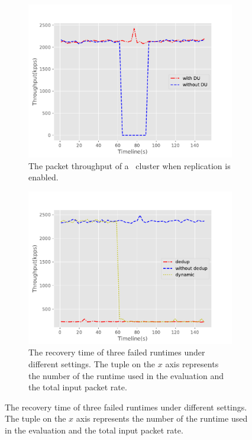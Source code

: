\begin{figure}[!ht]
\begin{subfigure}[t]{0.33\linewidth}
   \centering
   \includegraphics[width=\columnwidth]{figure/Dynamic.pdf}
   \caption{The packet throughput of a \nfactor~cluster when replication is enabled. }\label{fig:rep-scale}
  \end{subfigure}\hfill
  \begin{subfigure}[t]{0.33\linewidth}
 \centering
   \includegraphics[width=\columnwidth]{figure/Dedup.pdf}
   \caption{The recovery time of three failed runtimes under different settings. The tuple on the $x$ axis represents the number of the runtime used in the evaluation and the total input packet rate. }\label{fig:rep-recovery} \end{subfigure}\hfill

\end{figure}
